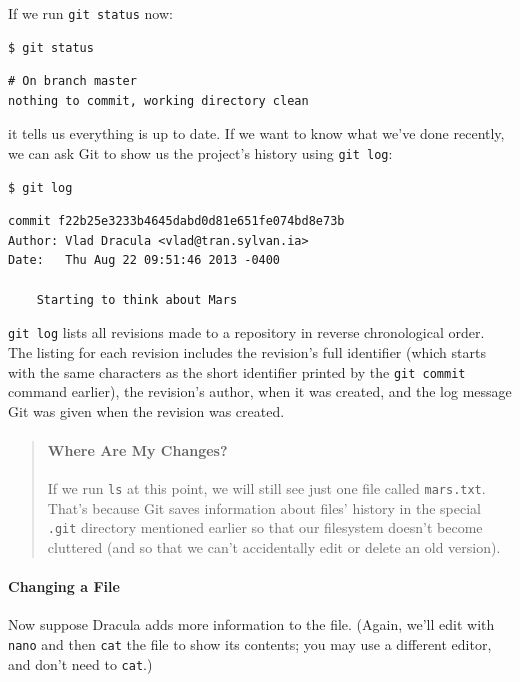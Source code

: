 \documentclass[]{book}
\begin{document}
If we run \texttt{git status} now:

\begin{verbatim}
$ git status
\end{verbatim}

\begin{verbatim}
# On branch master
nothing to commit, working directory clean
\end{verbatim}

it tells us everything is up to date. If we want to know what we've done
recently, we can ask Git to show us the project's history using
\texttt{git log}:

\begin{verbatim}
$ git log
\end{verbatim}

\begin{verbatim}
commit f22b25e3233b4645dabd0d81e651fe074bd8e73b
Author: Vlad Dracula <vlad@tran.sylvan.ia>
Date:   Thu Aug 22 09:51:46 2013 -0400

    Starting to think about Mars
\end{verbatim}

\texttt{git log} lists all revisions made to a repository in reverse
chronological order. The listing for each revision includes the
revision's full identifier (which starts with the same characters as the
short identifier printed by the \texttt{git commit} command earlier),
the revision's author, when it was created, and the log message Git was
given when the revision was created.

\begin{quote}
\mbox{}\paragraph{Where Are My Changes?}

If we run \texttt{ls} at this point, we will still see just one file
called \texttt{mars.txt}. That's because Git saves information about
files' history in the special \texttt{.git} directory mentioned earlier
so that our filesystem doesn't become cluttered (and so that we can't
accidentally edit or delete an old version).
\end{quote}

\mbox{}\paragraph{Changing a File}

Now suppose Dracula adds more information to the file. (Again, we'll
edit with \texttt{nano} and then \texttt{cat} the file to show its
contents; you may use a different editor, and don't need to
\texttt{cat}.)
\end{document}
